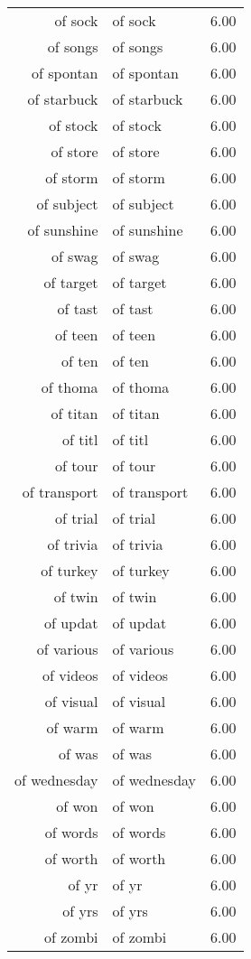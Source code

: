 \begin{table}[ht]
\begin{tabular}{rlr}
  of sock & of sock & 6.00 \\ 
  of songs & of songs & 6.00 \\ 
  of spontan & of spontan & 6.00 \\ 
  of starbuck & of starbuck & 6.00 \\ 
  of stock & of stock & 6.00 \\ 
  of store & of store & 6.00 \\ 
  of storm & of storm & 6.00 \\ 
  of subject & of subject & 6.00 \\ 
  of sunshine & of sunshine & 6.00 \\ 
  of swag & of swag & 6.00 \\ 
  of target & of target & 6.00 \\ 
  of tast & of tast & 6.00 \\ 
  of teen & of teen & 6.00 \\ 
  of ten & of ten & 6.00 \\ 
  of thoma & of thoma & 6.00 \\ 
  of titan & of titan & 6.00 \\ 
  of titl & of titl & 6.00 \\ 
  of tour & of tour & 6.00 \\ 
  of transport & of transport & 6.00 \\ 
  of trial & of trial & 6.00 \\ 
  of trivia & of trivia & 6.00 \\ 
  of turkey & of turkey & 6.00 \\ 
  of twin & of twin & 6.00 \\ 
  of updat & of updat & 6.00 \\ 
  of various & of various & 6.00 \\ 
  of videos & of videos & 6.00 \\ 
  of visual & of visual & 6.00 \\ 
  of warm & of warm & 6.00 \\ 
  of was & of was & 6.00 \\ 
  of wednesday & of wednesday & 6.00 \\ 
  of won & of won & 6.00 \\ 
  of words & of words & 6.00 \\ 
  of worth & of worth & 6.00 \\ 
  of yr & of yr & 6.00 \\ 
  of yrs & of yrs & 6.00 \\ 
  of zombi & of zombi & 6.00 \\ 

\end{tabular}
\end{table}
